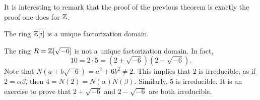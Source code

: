 It is interesting to remark that the proof 
of the previous theorem is exactly the proof
one does for $\mathbb{Z}$. 

\begin{example}
	The ring $\mathbb{Z}[i]$ is a unique factorization domain. 	
\end{example}

\begin{example}
	The ring $R=\mathbb{Z}[\sqrt{-6}]$ is not a unique factorization domain. In fact,
	\[
	10=2\cdot 5=(2+\sqrt{-6})(2-\sqrt{-6}).
	\]	
	Note that $N(a+b\sqrt{-6})=a^2+6b^2\ne 2$. This implies that $2$ is irreducible, as 
	if $2=\alpha\beta$, then $4=N(2)=N(\alpha)N(\beta)$. 
	Similarly, $5$ is irreducible. It is an exercise to prove that 
	$2+\sqrt{-6}$ and $2-\sqrt{-6}$ are both irreducible. 
\end{example}
